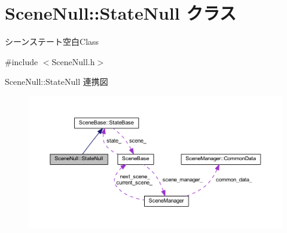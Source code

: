\hypertarget{class_scene_null_1_1_state_null}{}\section{Scene\+Null\+:\+:State\+Null クラス}
\label{class_scene_null_1_1_state_null}


シーンステート空白\+Class  




{\ttfamily \#include $<$Scene\+Null.\+h$>$}



Scene\+Null\+:\+:State\+Null 連携図\nopagebreak
\begin{figure}[H]
\begin{center}
\leavevmode
\includegraphics[width=350pt]{class_scene_null_1_1_state_null__coll__graph}
\end{center}
\end{figure}
